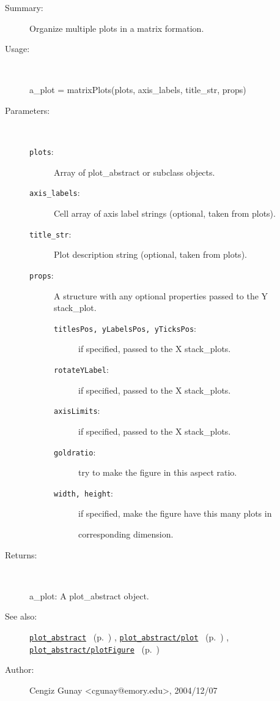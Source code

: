 \begin{description}
\item[Summary:]Organize multiple plots in a matrix formation.
%
\item[Usage:]~%
\begin{lyxcode}%
a\_plot = matrixPlots(plots, axis\_labels, title\_str, props)
%
\end{lyxcode}%
%
%
\item[Parameters:]~
\begin{description}%
\item[\texttt{plots}:]
 Array of plot\_abstract or subclass objects.
\item[\texttt{axis\_labels}:]
 Cell array of axis label strings (optional, taken from plots).
\item[\texttt{title\_str}:]
 Plot description string (optional, taken from plots).
\item[\texttt{props}:]
 A structure with any optional properties passed to the Y stack\_plot.
\begin{description}%
\item[\texttt{titlesPos, yLabelsPos, yTicksPos}:]
 if specified, passed to the X stack\_plots.
\item[\texttt{rotateYLabel}:]
 if specified, passed to the X stack\_plots.
\item[\texttt{axisLimits}:]
 if specified, passed to the X stack\_plots.
\item[\texttt{goldratio}:]
 try to make the figure in this aspect ratio.
\item[\texttt{width, height}:]
 if specified, make the figure have this many plots in 

corresponding dimension.
\end{description}%
\end{description}%
%
\item[Returns:
]~

	a\_plot: A plot\_abstract object.
%
%
\item[See also:]%
\hyperlink{ref_plot_abstract}{\texttt{plot\_abstract}}%
\ (p.~\pageref{ref_plot_abstract})%
%
, \hyperlink{ref_plot_abstract__plot}{\texttt{plot\_abstract/plot}}%
\ (p.~\pageref{ref_plot_abstract__plot})%
%
, \hyperlink{ref_plot_abstract__plotFigure}{\texttt{plot\_abstract/plotFigure}}%
\ (p.~\pageref{ref_plot_abstract__plotFigure})%
%
%
\item[Author:]%
Cengiz Gunay <cgunay@emory.edu>, 2004/12/07
%
\end{description}
\methodline%
